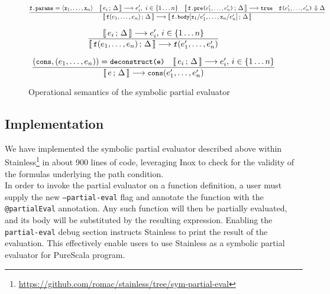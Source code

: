\documentclass[a4paper,twoside]{article}
\newcommand{\lb}[2]{\llbracket\, #1\,;\, #2\, \rrbracket}
\newcommand{\stt}[1]{\texttt{\small{#1}}}
\begin{document}
\begin{landscape}
\begin{figure}[htb]
\begin{framed}
\begin{equation}
\dfrac{
 \stt{f.params} = \langle \stt{x}_1, \ldots, \stt{x}_n \rangle
 \quad
 \lb{e_i}{\Delta} \longrightarrow e_i',\  i \in \{1 \ldots n\}
 \quad
 \lb{\stt{f.pre($e_1',\ldots,e_n'$)}}{\Delta} \longrightarrow \stt{true}
 \quad  \stt{f($e_1',\ldots,e_n'$)} \Downarrow \Delta
}{
  \lb{\stt{f}(e_1,\ldots,e_n)}{\Delta} \longrightarrow
  \lb{\stt{f.body}[\stt{x}_1/e_1',\ldots,\stt{x}_n/e_n']}{\Delta}
}
\label{fig:symbolicsem:fi2}
\end{equation}

\begin{equation}
\dfrac{
 \lb{e_i}{\Delta} \longrightarrow e_i',\, i \in \{1 \ldots n\}
}{
  \lb{\stt{f}(e_1,\ldots,e_n)}{\Delta} \longrightarrow
  \stt{f}(e_1',\ldots,e_n')
}
\label{fig:symbolicsem:fi3}
\end{equation}

\begin{equation}
\dfrac{
  (\stt{cons}, (e_1, \ldots, e_n)) = \stt{deconstruct(e)} \quad
  \lb{e_i}{\Delta} \longrightarrow e_i',\, i \in \{1 \ldots n\}
}{
  \lb{e}{\Delta} \longrightarrow \stt{cons}(e_1', \ldots, e_n')
}
\end{equation}

\end{framed}
\vspace{-10pt}
\caption{Operational semantics of the symbolic partial evaluator \label{fig:symbolicsem}}
\end{figure}
\end{landscape}

\subsection{Implementation}

We have implemented the symbolic partial evaluator described above within Stainless\footnote{\url{https://github.com/romac/stainless/tree/sym-partial-eval}} in about 900 lines of code, leveraging Inox to check for the validity of the formulas underlying the path condition.\\

In order to invoke the partial evaluator on a function definition, a user must supply the new \stt{--partial-eval} flag and annotate the function with the \stt{@partialEval} annotation. Any such function will then be partially evaluated, and its body will be substituted by the resulting expression. Enabling the \stt{partial-eval} debug section instructs Stainless to print the result of the evaluation. This effectively enable users to use Stainless as a symbolic partial evaluator for PureScala program.
\end{document}
